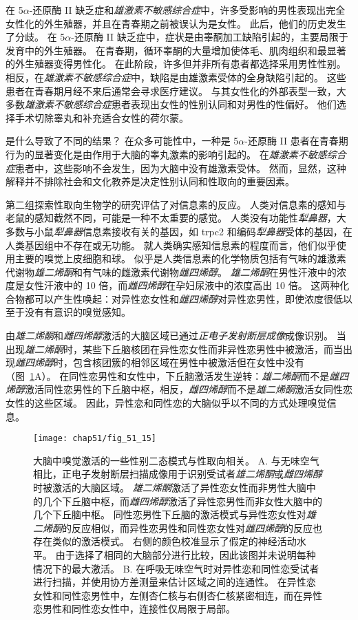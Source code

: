 在 5$\alpha$-还原酶 II 缺乏症和\textit{雄激素不敏感综合症}中，许多受影响的男性表现出完全女性化的外生殖器，并且在青春期之前被误认为是女性。
此后，他们的历史发生了分歧。
在 5$\alpha$-还原酶 II 缺乏症中，症状是由睾酮加工缺陷引起的，主要局限于发育中的外生殖器。
在青春期，循环睾酮的大量增加使体毛、肌肉组织和最显著的外生殖器变得男性化。
在此阶段，许多但并非所有患者都选择采用男性性别。
相反，在\textit{雄激素不敏感综合症}中，缺陷是由雄激素受体的全身缺陷引起的。
这些患者在青春期月经不来后通常会寻求医疗建议。
与其女性化的外部表型一致，大多数\textit{雄激素不敏感综合症}患者表现出女性的性别认同和对男性的性偏好。
他们选择手术切除睾丸和补充适合女性的荷尔蒙。


是什么导致了不同的结果？
在众多可能性中，一种是 5$\alpha$-还原酶 II 患者在青春期行为的显著变化是由作用于大脑的睾丸激素的影响引起的。
在\textit{雄激素不敏感综合症}患者中，这些影响不会发生，因为大脑中没有雄激素受体。
然而，显然，这种解释并不排除社会和文化教养是决定性别认同和性取向的重要因素。


第二组探索性取向生物学的研究评估了对信息素的反应。
人类对信息素的感知与老鼠的感知截然不同，可能是一种不太重要的感觉。
人类没有功能性\textit{犁鼻器}，大多数与小鼠\textit{犁鼻器}信息素接收有关的基因，如 trpc2 和编码\textit{犁鼻器}受体的基因，在人类基因组中不存在或无功能。
就人类确实感知信息素的程度而言，他们似乎使用主要的嗅觉上皮细胞和球。
似乎是人类信息素的化学物质包括有气味的雄激素代谢物\textit{雄二烯酮}和有气味的雌激素代谢物\textit{雌四烯醇}。
\textit{雄二烯酮}在男性汗液中的浓度是女性汗液中的 10 倍，而\textit{雌四烯醇}在孕妇尿液中的浓度高出 10 倍。
这两种化合物都可以产生性唤起：对异性恋女性和\textit{雌四烯醇}对异性恋男性，即使浓度很低以至于没有有意识的嗅觉感知。


由\textit{雄二烯酮}和\textit{雌四烯醇}激活的大脑区域已通过\textit{正电子发射断层成像}成像识别。
当出现\textit{雄二烯酮}时，某些下丘脑核团在异性恋女性而非异性恋男性中被激活，而当出现\textit{雌四烯醇}时，包含核团簇的相邻区域在男性中被激活但在女性中没有（图~\ref{fig:51_15}A）。
在同性恋男性和女性中，下丘脑激活发生逆转：\textit{雄二烯酮}而不是\textit{雌四烯醇}激活同性恋男性的下丘脑中枢，相反，\textit{雌四烯醇}而不是\textit{雄二烯酮}激活女同性恋女性的这些区域。
因此，异性恋和同性恋的大脑似乎以不同的方式处理嗅觉信息。


\begin{figure}[htbp]
	\centering
	\texttt{[image: chap51/fig\_51\_15]}
	\caption{大脑中嗅觉激活的一些性别二态模式与性取向相关。
		A. 与无味空气相比，正电子发射断层扫描成像用于识别受试者\textit{雄二烯酮}或\textit{雌四烯醇}时被激活的大脑区域。
		\textit{雄二烯酮}激活了异性恋女性而非男性大脑中的几个下丘脑中枢，而\textit{雌四烯醇}激活了异性恋男性而非女性大脑中的几个下丘脑中枢。
		同性恋男性下丘脑的激活模式与异性恋女性对\textit{雄二烯酮}的反应相似，而异性恋男性和同性恋女性对\textit{雌四烯醇}的反应也存在类似的激活模式。
		右侧的颜色校准显示了假定的神经活动水平。
		由于选择了相同的大脑部分进行比较，因此该图并未说明每种情况下的最大激活\cite{berglund2006brain}。
		B. 在呼吸无味空气时对异性恋和同性恋受试者进行扫描，并使用协方差测量来估计区域之间的连通性。
		在异性恋女性和同性恋男性中，左侧杏仁核与右侧杏仁核紧密相连，而在异性恋男性和同性恋女性中，连接性仅局限于局部\cite{savic2008pet}。}
	\label{fig:51_15}
\end{figure}


